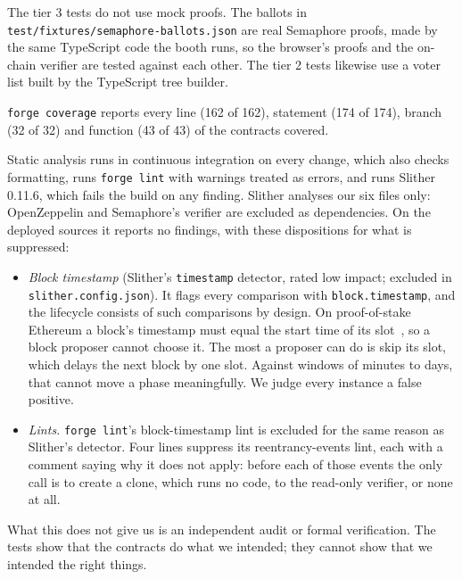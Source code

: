 The tier 3 tests do not use mock proofs. The ballots in
\texttt{test/fixtures/semaphore-ballots.json} are real Semaphore proofs, made by
the same TypeScript code the booth runs, so the browser's proofs and the
on-chain verifier are tested against each other. The tier 2 tests likewise use
a voter list built by the TypeScript tree builder.

\texttt{forge coverage} reports every line (162 of 162), statement (174 of
174), branch (32 of 32) and function (43 of 43) of the contracts covered.

Static analysis runs in continuous integration on every change, which also
checks formatting,
runs \texttt{forge lint} with warnings treated as errors, and runs
Slither~\cite{slither} 0.11.6, which fails the build on any finding. Slither
analyses our six files only: OpenZeppelin and Semaphore's verifier are
excluded as dependencies. On the deployed sources it reports no findings, with
these dispositions for what is suppressed:

\begin{itemize}
  \item \emph{Block timestamp} (Slither's \texttt{timestamp} detector, rated
        low impact; excluded in \texttt{slither.config.json}). It flags every
        comparison with \texttt{block.timestamp}, and the lifecycle consists of
        such comparisons by design. On proof-of-stake Ethereum a block's
        timestamp must equal the start time of its slot~\cite{bellatrix}, so a
        block proposer cannot choose it. The most a proposer can do is skip its
        slot, which delays the next block by one slot. Against windows of
        minutes to days, that cannot move a phase meaningfully. We judge every
        instance a false positive.
  \item \emph{Lints.} \texttt{forge lint}'s block-timestamp lint is excluded
        for the same reason as Slither's detector. Four lines suppress its
        reentrancy-events lint, each with a comment saying why it does not
        apply: before each of those events the only call is to create a
        clone, which runs no code, to the read-only verifier, or none at all.
\end{itemize}

What this does not give us is an independent audit or formal verification.
The tests show that the contracts do what we intended; they cannot show that
we intended the right things.
